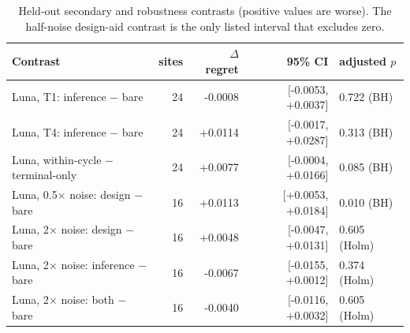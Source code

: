\begin{table}[t]
\centering\small
\setlength{\tabcolsep}{4pt}
\begin{tabular}{@{}lrrrl@{}}
\toprule
Contrast & sites & $\Delta$ regret & 95\% CI & adjusted $p$ \\
\midrule
Luna, T1: inference $-$ bare & 24 & -0.0008 & [-0.0053, +0.0037] & 0.722 (BH) \\
Luna, T4: inference $-$ bare & 24 & +0.0114 & [-0.0017, +0.0287] & 0.313 (BH) \\
Luna, within-cycle $-$ terminal-only & 24 & +0.0077 & [-0.0004, +0.0166] & 0.085 (BH) \\
Luna, 0.5$\times$ noise: design $-$ bare & 16 & +0.0113 & [+0.0053, +0.0184] & 0.010 (BH) \\
Luna, 2$\times$ noise: design $-$ bare & 16 & +0.0048 & [-0.0047, +0.0131] & 0.605 (Holm) \\
Luna, 2$\times$ noise: inference $-$ bare & 16 & -0.0067 & [-0.0155, +0.0012] & 0.374 (Holm) \\
Luna, 2$\times$ noise: both $-$ bare & 16 & -0.0040 & [-0.0116, +0.0032] & 0.605 (Holm) \\
\bottomrule
\end{tabular}
\caption{Held-out secondary and robustness contrasts (positive values are worse). The half-noise design-aid contrast is the only listed interval that excludes zero.}
\label{tab:phase4-secondary}
\end{table}

